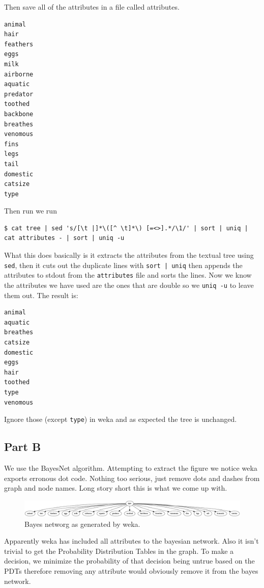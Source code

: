\documentclass[11pt,a4paper]{article}
\begin{document}
   Then save all of the attributes in a file called attributes.


\begin{verbatim}
animal
hair
feathers
eggs
milk
airborne
aquatic
predator
toothed
backbone
breathes
venomous
fins
legs
tail
domestic
catsize
type
\end{verbatim}

   Then run we run


\begin{verbatim}
$ cat tree | sed 's/[\t |]*\([^ \t]*\) [=<>].*/\1/' | sort | uniq | cat attributes - | sort | uniq -u
\end{verbatim}

   What this does basically is it extracts the attributes from the
   textual tree using \texttt{sed}, then it cuts out the duplicate lines
   with \texttt{sort | uniq} then appends the attributes to stdout from the
   \texttt{attributes} file and sorts the lines. Now we know the attributes
   we have used are the ones that are double so we \texttt{uniq -u} to leave
   them out. The result is:


\begin{verbatim}
animal
aquatic
breathes
catsize
domestic
eggs
hair
toothed
type
venomous
\end{verbatim}

   Ignore those (except \texttt{type}) in weka and as expected the tree is
   unchanged.
\subsection{Part B}
\label{sec-1-2}

   We use the BayesNet algorithm. Attempting to extract the figure we
   notice weka exports erronous dot code. Nothing too serious, just
   remove dots and dashes from graph and node names. Long story short
   this is what we come up with.

   \begin{figure}[htb]
   \centering
   \includegraphics[width=.9\linewidth]{./bayes.png}
   \caption{Bayes networg as generated by weka.}
   \end{figure}

   Apparently weka has included all attributes to the bayesian
   network. Also it isn't trivial to get the Probability Distribution
   Tables in the graph. To make a decision, we minimize the
   probability of that decision being untrue based on the PDTs
   therefore removing any attribute would obviously remove it from the
   bayes network.
\end{document}

